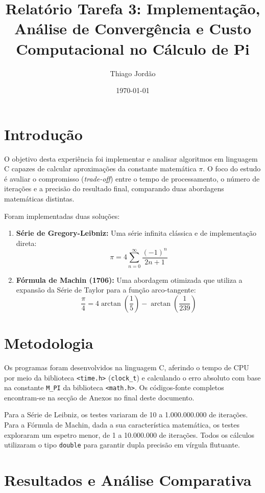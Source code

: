 \documentclass[a4paper,12pt]{article}
\title{Relatório Tarefa 3: Implementação, Análise de Convergência e Custo Computacional no Cálculo de Pi}
\author{Thiago Jordão}
\date{\today}
\begin{document}
\maketitle

\section{Introdução}

O objetivo desta experiência foi implementar e analisar algoritmos em linguagem C capazes de calcular aproximações da constante matemática $\pi$. O foco do estudo é avaliar o compromisso (\textit{trade-off}) entre o tempo de processamento, o número de iterações e a precisão do resultado final, comparando duas abordagens matemáticas distintas.

Foram implementadas duas soluções:

\begin{enumerate}
    \item \textbf{Série de Gregory-Leibniz:} Uma série infinita clássica e de implementação direta:
    \[\pi = 4 \sum_{n=0}^{\infty} \frac{(-1)^n}{2n+1}\]

    \item \textbf{Fórmula de Machin (1706):} Uma abordagem otimizada que utiliza a expansão da Série de Taylor para a função arco-tangente:
    \[\frac{\pi}{4} = 4 \arctan\left(\frac{1}{5}\right) - \arctan\left(\frac{1}{239}\right)\]
\end{enumerate}

\section{Metodologia}

Os programas foram desenvolvidos na linguagem C, aferindo o tempo de CPU por meio da biblioteca \texttt{<time.h>} (\texttt{clock\_t}) e calculando o erro absoluto com base na constante \texttt{M\_PI} da biblioteca \texttt{<math.h>}. Os códigos-fonte completos encontram-se na secção de Anexos no final deste documento.

Para a Série de Leibniz, os testes variaram de 10 a 1.000.000.000 de iterações. Para a Fórmula de Machin, dada a sua característica matemática, os testes exploraram um espetro menor, de 1 a 10.000.000 de iterações. Todos os cálculos utilizaram o tipo \texttt{double} para garantir dupla precisão em vírgula flutuante.

\section{Resultados e Análise Comparativa}
\end{document}
